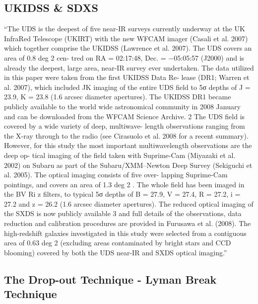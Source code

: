   \subsection{UKIDSS \& SDXS}
    ``The UDS is the deepest of five near-IR surveys currently underway
      at the UK InfraRed Telescope (UKIRT) with the new WFCAM
      imager (Casali et al. 2007) which together comprise the UKIDSS
      (Lawrence et al. 2007). The UDS covers an area of 0.8 deg 2 cen-
      tred on RA = 02:17:48, Dec. = −05:05:57 (J2000) and is already
      the deepest, large area, near-IR survey ever undertaken. The data
      utilized in this paper were taken from the first UKIDSS Data Re-
      lease (DR1; Warren et al. 2007), which included JK imaging of the
      entire UDS field to 5σ depths of J = 23.9, K = 23.8 (1.6 arcsec
      diameter apertures). The UKIDSS DR1 became publicly available
      to the world wide astronomical community in 2008 January and can
      be downloaded from the WFCAM Science Archive. 2
      The UDS field is covered by a wide variety of deep, multiwave-
      length observations ranging from the X-ray through to the radio (see
      Cirasuolo et al. 2008 for a recent summary). However, for this study
      the most important multiwavelength observations are the deep op-
      tical imaging of the field taken with Suprime-Cam (Miyazaki et al.
      2002) on Subaru as part of the Subaru/XMM–Newton Deep Survey
      (Sekiguchi et al. 2005). The optical imaging consists of five over-
      lapping Suprime-Cam pointings, and covers an area of 1.3 deg 2 .
      The whole field has been imaged in the BV Ri z filters, to typical
      5σ depths of B = 27.9, V = 27.4, R = 27.2, i = 27.2 and z = 26.2
      (1.6 arcsec diameter apertures). The reduced optical imaging of the
      SXDS is now publicly available 3 and full details of the observations,
      data reduction and calibration procedures are provided in Furusawa
      et al. (2008). The high-redshift galaxies investigated in this study
      were selected from a contiguous area of 0.63 deg 2 (excluding areas
      contaminated by bright stars and CCD blooming) covered by both
      the UDS near-IR and SXDS optical imaging.'' \cite{mclure09}
      
\subsection{The Drop-out Technique - Lyman Break Technique}

\cite{steidel03}